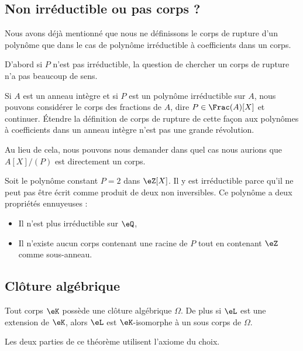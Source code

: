 \subsection{Non irréductible ou pas corps ?}
\label{SUBSECooEDMJooTXBfOu}

Nous avons déjà mentionné que nous ne définissons le corps de rupture d'un polynôme que dans le cas de polynôme irréductible à coefficients dans un corps.

D'abord si \( P\) n'est pas irréductible, la question de chercher un corps de rupture n'a pas beaucoup de sens.

Si \( A\) est un anneau intègre et si \( P\) est un polynôme irréductible sur \( A\), nous pouvons considérer le corps des fractions de \( A\), dire \( P\in\Frac(A)[X]\) et continuer. Étendre la définition de corps de rupture de cette façon aux polynômes à coefficients dans un anneau intègre n'est pas une grande révolution.

Au lieu de cela, nous pouvons nous demander dans quel cas nous aurions que \( A[X]/(P)\) est directement un corps.

\begin{example}
    Soit le polynôme constant \( P=2\) dans \( \eZ[X]\). Il y est irréductible parce qu'il ne peut pas être écrit comme produit de deux non inversibles. Ce polynôme a deux propriétés ennuyeuses :
    \begin{itemize}
        \item Il n'est plus irréductible sur \( \eQ\),
        \item Il n'existe aucun corps contenant une racine de \( P\) tout en contenant \( \eZ\) comme sous-anneau.
    \end{itemize}
\end{example}

\subsection{Clôture algébrique}

\begin{theorem}     \label{THOooQFWWooMWXEhT}
    Tout corps \( \eK\) possède une clôture algébrique \( \Omega\). De plus si \( \eL\) est une extension de \( \eK\), alors \( \eL\) est \( \eK\)-isomorphe à un sous corps de \( \Omega\).
\end{theorem}
Les deux parties de ce théorème utilisent l'axiome du choix.

